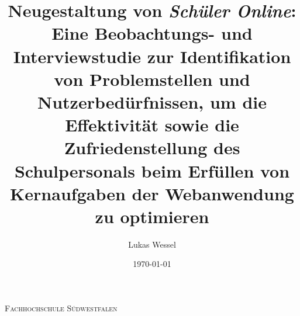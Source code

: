\documentclass[pdftex,a4paper,abstracton,11pt,parskip=half,bibtotocnumbered]{scrartcl}
\title{Neugestaltung von \textit{Schüler Online}: Eine Beobachtungs- und Interviewstudie zur Identifikation von Problemstellen und Nutzerbedürfnissen, um die Effektivität sowie die Zufriedenstellung des Schulpersonals beim Erfüllen von Kernaufgaben der Webanwendung zu optimieren}
\author{Lukas Wessel}
\date{\today}
\begin{document}

\makeatletter
\begin{titlepage}
	\centering
	{\scshape\LARGE Fachhochschule Südwestfalen \par}
	\vspace{1cm}
	\vspace{1.5cm}
	{\huge\bfseries \@title\par}
	\vspace{3cm}
	{\Large \@author\par}
	\vspace{1cm}
	{\Large \@date\par}
	\vfill

	\raggedright
\end{titlepage}
\makeatother
\end{document}
